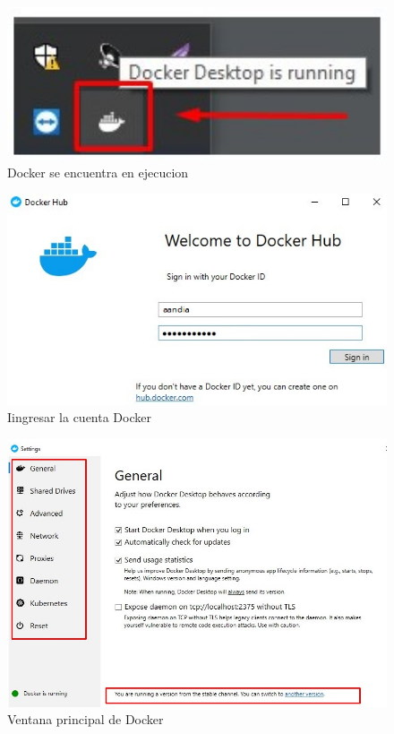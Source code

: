 \documentclass[preprint,12pt]{elsarticle}
\begin{document}
\begin{figure}[H]
	\begin{center}
		\includegraphics[width=12cm]{./IMAGENES/foto2} 
		\caption{Docker se encuentra en ejecucion}
	\end{center}
\end{figure}

\begin{figure}[H]
	\begin{center}
		\includegraphics[width=12cm]{./IMAGENES/foto3} 
		\caption{Iingresar la cuenta Docker}
	\end{center}
\end{figure}

\begin{figure}[H]
	\begin{center}
		\includegraphics[width=12cm]{./IMAGENES/foto4} 
		\caption{Ventana principal de Docker}
	\end{center}
\end{figure}
\end{document}

